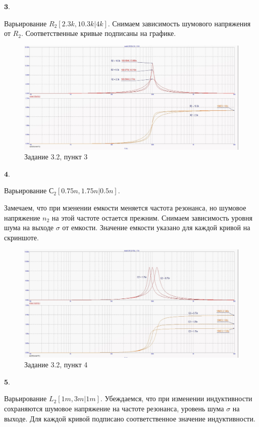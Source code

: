 \documentclass[a4paper, 14pt]{extarticle}%
\begin{document}
$\textbf{3.}$


Варьирование $R_2[2.3k, 10.3k | 4k]$.
Снимаем зависимость шумового напряжения от $R_2$. Соответственные кривые подписаны на графике.

\begin{figure}[h!]
			\centering
			\includegraphics[width=1.1\linewidth]{3/3_2_5.jpg}
			\caption{Задание 3.2, пункт 3}
			\label{A}
\end{figure}

$\textbf{4.}$


Варьирование $С_2[0.75n, 1.75n | 0.5n]$.

Замечаем, что при мзенении емкости меняется частота резонанса, но шумовое напряжение $n_2$ на этой частоте остается прежним.
Снимаем зависимость уровня шума на выходе $\sigma$ от емкости.
Значение емкости указано для каждой кривой на скриншоте.

\begin{figure}[h!]
			\centering
			\includegraphics[width=1.1\linewidth]{3/3_2_3.jpg}
			\caption{Задание 3.2, пункт 4}
			\label{A}
\end{figure}


$\textbf{5.}$


Варьирование $L_2[1m, 3m | 1m]$.
Убеждаемся, что при изменении индуктивности сохраняются шумовое напряжение на частоте резонанса, уровень шума $\sigma$ на выходе. Для каждой кривой подписано соответственное значение индуктивности.
\end{document}
